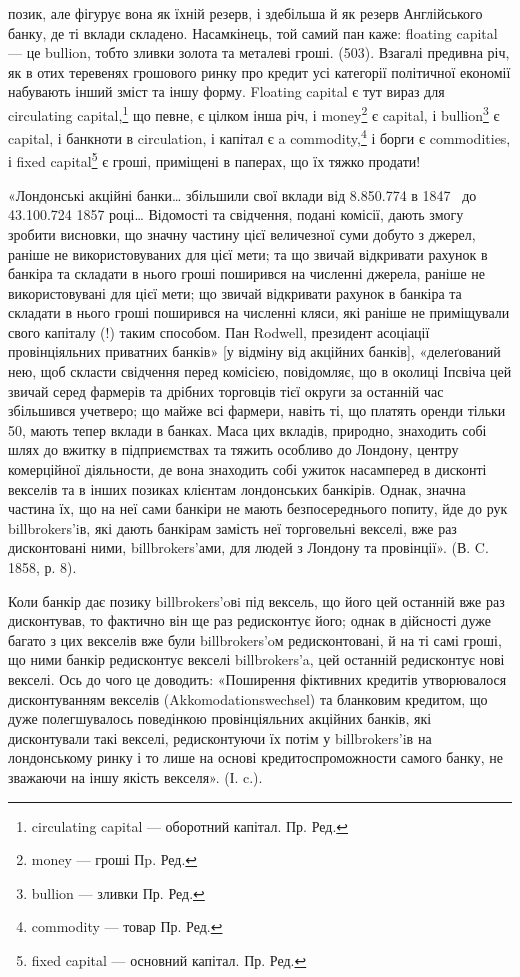 \parcont{}  %
позик, але фігурує вона як їхній резерв, і здебільша й як резерв Англійського
банку, де ті вклади складено. Насамкінець, той самий пан каже: floating
capital — це bullion, тобто зливки золота та металеві гроші. (503). Взагалі предивна
річ, як в отих теревенях грошового ринку про кредит усі категорії політичної
економії набувають інший зміст та іншу форму. Floating capital є тут
вираз для circulating capital,\footnote*{
circulating capital — оборотний капітал. Пр. Ред.
} що певне, є цілком інша річ, і money\footnote*{
money — гроші Пp. Ред.
} є capital,
і bullion\footnote*{
bullion — зливки Пр. Ред.
} є capital, і банкноти в circulation, і капітал є a commodity,\footnote*{
commodity — товар Пр. Ред.
} і борги є
commodities, і fixed capital\footnote*{
fixed capital — основний капітал. Пр. Ред.
} є гроші, приміщені в паперах, що їх тяжко продати!

«Лондонські акційні банки\dots{} збільшили свої вклади від \num{8.850.774}
в 1847~ до \num{43.100.724} 1857 році\dots{} Відомості та свідчення, подані
комісії, дають змогу зробити висновки, що значну частину цієї величезної суми
добуто з джерел, раніше не використовуваних для цієї мети; та що звичай відкривати
рахунок в банкіра та складати в нього гроші поширився на численні
джерела, раніше не використовувані для цієї мети; що звичай відкривати рахунок
в банкіра та складати в нього гроші поширився на численні кляси, які
раніше не приміщували свого капіталу (!) таким способом. Пан Rodwell, президент
асоціації провінціяльних приватних банків» [у відміну від акційних
банків], «делеґований нею, щоб скласти свідчення перед комісією, повідомляє,
що в околиці Іпсвіча цей звичай серед фармерів та дрібних торговців тієї
округи за останній час збільшився учетверо; що майже всі фармери, навіть ті,
що платять оренди тільки 50, мають тепер вклади в банках. Маса
цих вкладів, природно, знаходить собі шлях до вжитку в підприємствах та
тяжить особливо до Лондону, центру комерційної діяльности, де вона знаходить
собі ужиток насамперед в дисконті векселів та в інших позиках клієнтам лондонських
банкірів. Однак, значна частина їх, що на неї сами банкіри не мають
безпосереднього попиту, йде до рук billbrokers’iв, які дають банкірам замість
неї торговельні векселі, вже раз дисконтовані ними, billbrokers’ами, для людей
з Лондону та провінції». (В. C. 1858, р. 8).

Коли банкір дає позику billbrokers’oвi під вексель, що його цей останній
вже раз дисконтував, то фактично він ще раз редисконтує його; однак в дійсності
дуже багато з цих векселів вже були billbrokers’oм редисконтовані, й на
ті самі гроші, що ними банкір редисконтує векселі billbrokers’a, цей останній
редисконтує нові векселі. Ось до чого це доводить: «Поширення фіктивних кредитів
утворювалося дисконтуванням векселів (Akkomodationswechsel) та бланковим
кредитом, що дуже полегшувалось поведінкою провінціяльних акційних банків,
які дисконтували такі векселі, редисконтуючи їх потім у billbrokers’iв на лондонському
ринку і то лише на основі кредитоспроможности самого банку, не
зважаючи на іншу якість векселя». (І. c.).

